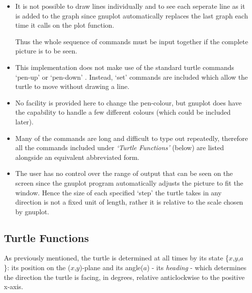 \begin{itemize}
 \item It is not possible to draw lines individually and to see each
        seperate line as it is added to the graph since gnuplot
        automatically replaces the last graph each time it calls on
        the plot function.

       Thus the whole sequence of commands must be input together if
        the complete picture is to be seen.
 \item This implementation does not make use of the standard turtle
        commands `pen-up' or `pen-down' . Instead, `set' commands are
        included which allow the turtle to move without drawing a line.
 \item No facility is provided here to change the pen-colour, but gnuplot
        does have the capability to handle a few different colours (which
        could be included later).
 \item Many of the commands are long and difficult to type out repeatedly,
        therefore all the commands included under \emph{`Turtle Functions'}
        (below) are listed alongside an equivalent abbreviated form.
 \item The user has no control over the range of output that can be seen
        on the screen since the gnuplot program automatically adjusts the
        picture to fit the window. Hence the size of each specified `step'
        the turtle takes in any direction is not a fixed unit of length,
        rather it is relative to the scale chosen by gnuplot.
\end{itemize}


\subsection{Turtle Functions}
 As previously mentioned, the turtle is determined at all times by its
state \{$x$,$y$,$a$\}: its position on the \mbox{($x$,$y$)-plane} and its
angle($a$) - its \emph{heading} - which determines the direction the
turtle is facing, in degrees, relative anticlockwise to the positive
x-axis.     
       

